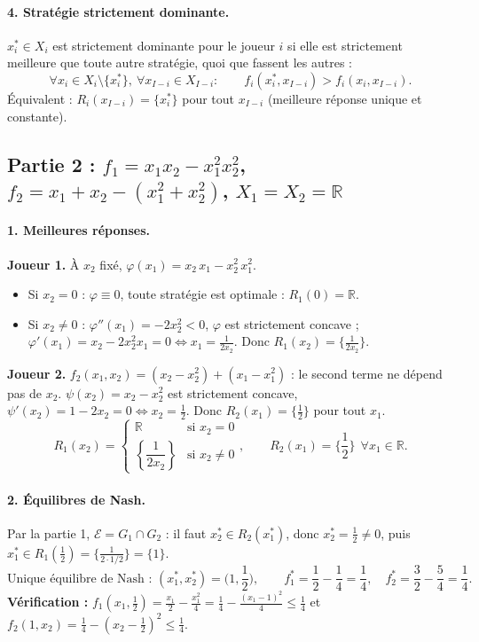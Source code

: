 \documentclass[11pt,a4paper]{article}
\begin{document}
\paragraph{4. Stratégie strictement dominante.} $x_i^*\in X_i$ est strictement dominante pour le joueur $i$ si elle est strictement meilleure que toute autre stratégie, quoi que fassent les autres :
\[
\forall x_i\in X_i\setminus\{x_i^*\},\ \forall x_{I-i}\in X_{I-i}:\qquad f_i(x_i^*,x_{I-i})>f_i(x_i,x_{I-i}).
\]
Équivalent : $R_i(x_{I-i})=\{x_i^*\}$ pour tout $x_{I-i}$ (meilleure réponse unique et constante).

\subsection*{Partie 2 : $f_1=x_1x_2-x_1^2x_2^2$, $f_2=x_1+x_2-(x_1^2+x_2^2)$, $X_1=X_2=\mathbb{R}$}

\paragraph{1. Meilleures réponses.}
\textbf{Joueur 1.} À $x_2$ fixé, $\varphi(x_1)=x_2\,x_1-x_2^2\,x_1^2$.
\begin{itemize}
\item Si $x_2=0$ : $\varphi\equiv0$, toute stratégie est optimale : $R_1(0)=\mathbb{R}$.
\item Si $x_2\ne0$ : $\varphi''(x_1)=-2x_2^2<0$, $\varphi$ est strictement concave ; $\varphi'(x_1)=x_2-2x_2^2x_1=0\iff x_1=\frac{1}{2x_2}$. Donc $R_1(x_2)=\big\{\frac1{2x_2}\big\}$.
\end{itemize}
\textbf{Joueur 2.} $f_2(x_1,x_2)=(x_2-x_2^2)+(x_1-x_1^2)$ : le second terme ne dépend pas de $x_2$. $\psi(x_2)=x_2-x_2^2$ est strictement concave, $\psi'(x_2)=1-2x_2=0\iff x_2=\frac12$. Donc $R_2(x_1)=\big\{\frac12\big\}$ pour tout $x_1$.
\[
\boxed{R_1(x_2)=\begin{cases}\mathbb{R} & \text{si } x_2=0\\ \left\{\dfrac{1}{2x_2}\right\} & \text{si } x_2\neq0\end{cases},\qquad R_2(x_1)=\Big\{\frac12\Big\}\ \ \forall x_1\in\mathbb{R}.}
\]

\paragraph{2. Équilibres de Nash.} Par la partie 1, $\mathcal{E}=G_1\cap G_2$ : il faut $x_2^*\in R_2(x_1^*)$, donc $x_2^*=\frac12\ne0$, puis $x_1^*\in R_1(\frac12)=\{\frac{1}{2\cdot1/2}\}=\{1\}$.
\[
\boxed{\text{Unique équilibre de Nash : } (x_1^*,x_2^*)=\Big(1,\frac12\Big),\qquad f_1^*=\frac12-\frac14=\frac14,\quad f_2^*=\frac32-\frac54=\frac14.}
\]
\textbf{Vérification :} $f_1(x_1,\frac12)=\frac{x_1}{2}-\frac{x_1^2}{4}=\frac14-\frac{(x_1-1)^2}{4}\le\frac14$ et $f_2(1,x_2)=\frac14-(x_2-\frac12)^2\le\frac14$. \checkmark
\end{document}
